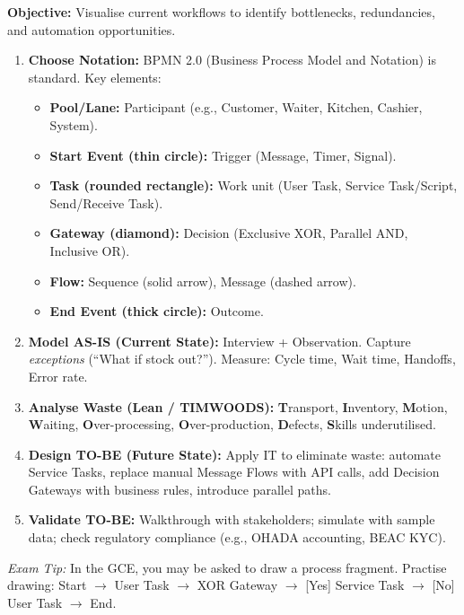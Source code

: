 \documentclass[11pt]{article}
\begin{document}
\begin{methode}
\textbf{Objective:} Visualise current workflows to identify bottlenecks, redundancies, and automation opportunities.
\begin{enumerate}
    \item \textbf{Choose Notation:} BPMN 2.0 (Business Process Model and Notation) is standard. Key elements:
    \begin{itemize}
        \item \textbf{Pool/Lane:} Participant (e.g., Customer, Waiter, Kitchen, Cashier, System).
        \item \textbf{Start Event (thin circle):} Trigger (Message, Timer, Signal).
        \item \textbf{Task (rounded rectangle):} Work unit (User Task, Service Task/Script, Send/Receive Task).
        \item \textbf{Gateway (diamond):} Decision (Exclusive XOR, Parallel AND, Inclusive OR).
        \item \textbf{Flow:} Sequence (solid arrow), Message (dashed arrow).
        \item \textbf{End Event (thick circle):} Outcome.
    \end{itemize}
    \item \textbf{Model AS-IS (Current State):} Interview + Observation. Capture \emph{exceptions} (``What if stock out?''). Measure: Cycle time, Wait time, Handoffs, Error rate.
    \item \textbf{Analyse Waste (Lean / TIMWOODS):} \textbf{T}ransport, \textbf{I}nventory, \textbf{M}otion, \textbf{W}aiting, \textbf{O}ver-processing, \textbf{O}ver-production, \textbf{D}efects, \textbf{S}kills underutilised.
    \item \textbf{Design TO-BE (Future State):} Apply IT to eliminate waste: automate Service Tasks, replace manual Message Flows with API calls, add Decision Gateways with business rules, introduce parallel paths.
    \item \textbf{Validate TO-BE:} Walkthrough with stakeholders; simulate with sample data; check regulatory compliance (e.g., OHADA accounting, BEAC KYC).
\end{enumerate}
\emph{Exam Tip:} In the GCE, you may be asked to draw a process fragment. Practise drawing: Start $\to$ User Task $\to$ XOR Gateway $\to$ [Yes] Service Task $\to$ [No] User Task $\to$ End.
\end{methode}
\end{document}
